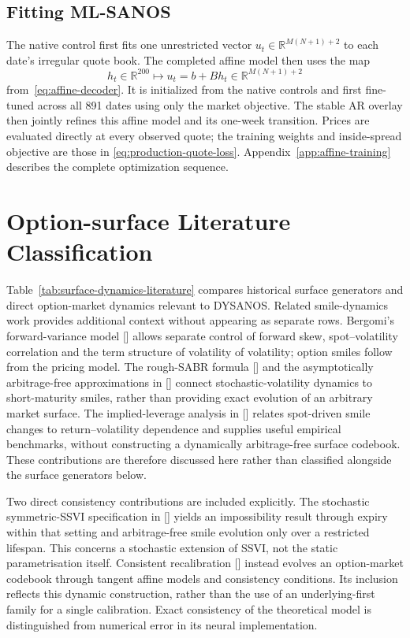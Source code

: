 \documentclass[11pt,a4paper]{article}
\newcommand{\R}{\mathbb{R}}
\begin{document}
\subsection{Fitting ML-SANOS}

The native control first fits one unrestricted vector
$u_t\in\R^{M(N+1)+2}$ to each date's irregular quote book.  The completed
affine model then uses the map
\[
  h_t\in\R^{200}
  \longmapsto
  u_t=b+Bh_t\in\R^{M(N+1)+2}
\]
from~\eqref{eq:affine-decoder}.  It is initialized from the native controls
and first fine-tuned across all 891 dates using only the market objective.
The stable AR overlay then jointly refines this affine model and its one-week
transition.  Prices are evaluated directly at every observed quote; the
training weights and inside-spread objective are those in
\eqref{eq:production-quote-loss}.  Appendix~\ref{app:affine-training}
describes the complete optimization sequence.

\clearpage
\section{Option-surface Literature Classification}
\label{app:literature-tables}
Table~\ref{tab:surface-dynamics-literature} compares historical surface
generators and direct option-market dynamics relevant to DYSANOS. Related
smile-dynamics work provides additional context without appearing as separate
rows. Bergomi's forward-variance model [] allows
separate control of forward skew, spot--volatility correlation and the term
structure of volatility of volatility; option smiles follow from the pricing
model. The rough-SABR formula [] and the
asymptotically arbitrage-free approximations in
[] connect stochastic-volatility dynamics to
short-maturity smiles, rather than providing exact evolution of an arbitrary
market surface. The implied-leverage analysis in
[] relates spot-driven smile
changes to return--volatility dependence and supplies useful empirical
benchmarks, without constructing a dynamically arbitrage-free surface
codebook. These contributions are therefore discussed here rather than
classified alongside the surface generators below.

Two direct consistency contributions are included explicitly. The stochastic
symmetric-SSVI specification in [] yields an
impossibility result through expiry within that setting and arbitrage-free
smile evolution only over a restricted lifespan. This concerns a stochastic
extension of SSVI, not the static parametrisation itself. Consistent
recalibration [] instead evolves an
option-market codebook through tangent affine models and consistency
conditions. Its inclusion reflects this dynamic construction, rather than
the use of an underlying-first family for a single calibration. Exact
consistency of the theoretical model is distinguished from numerical error
in its neural implementation.
\end{document}
